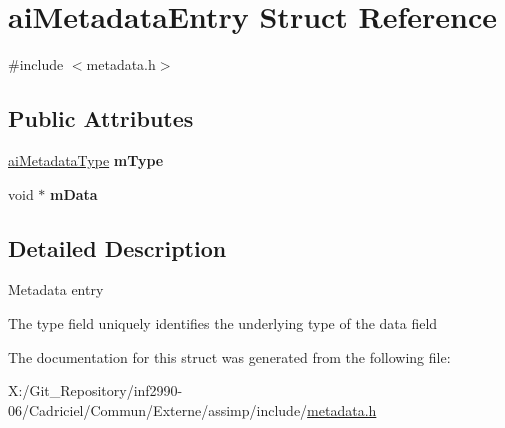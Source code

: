 \hypertarget{structai_metadata_entry}{\section{ai\-Metadata\-Entry Struct Reference}
\label{structai_metadata_entry}
}


{\ttfamily \#include $<$metadata.\-h$>$}

\subsection*{Public Attributes}
\begin{DoxyCompactItemize}
\item 
\hypertarget{structai_metadata_entry_a075b29cd710e153f5402f479a7a10aee}{\hyperlink{metadata_8h_aa910906c37416da57bb36335a4d04232}{ai\-Metadata\-Type} {\bfseries m\-Type}}\label{structai_metadata_entry_a075b29cd710e153f5402f479a7a10aee}

\item 
\hypertarget{structai_metadata_entry_a97fe80a47846374edd38bda5b50b99b3}{void $\ast$ {\bfseries m\-Data}}\label{structai_metadata_entry_a97fe80a47846374edd38bda5b50b99b3}

\end{DoxyCompactItemize}


\subsection{Detailed Description}
Metadata entry

The type field uniquely identifies the underlying type of the data field 

The documentation for this struct was generated from the following file\-:\begin{DoxyCompactItemize}
\item 
X\-:/\-Git\-\_\-\-Repository/inf2990-\/06/\-Cadriciel/\-Commun/\-Externe/assimp/include/\hyperlink{metadata_8h}{metadata.\-h}\end{DoxyCompactItemize}
